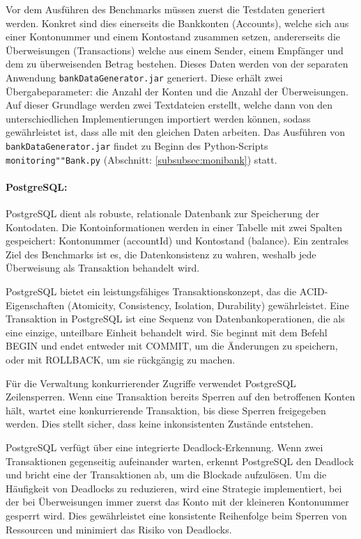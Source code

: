 \documentclass[fontsize=12pt,paper=a4,twoside=semi,parskip=half-,headsepline,headinclude]{scrreprt}
\begin{document}
 Vor dem Ausführen des Benchmarks müssen zuerst die Testdaten generiert werden. Konkret sind dies einerseits die Bankkonten (Accounts), welche sich aus einer Kontonummer und einem Kontostand zusammen setzen, andererseits die Überweisungen (Transactions) welche aus einem Sender, einem Empfänger und dem zu überweisenden Betrag bestehen. Dieses Daten werden von der separaten Anwendung \texttt{bankDataGenerator.jar} generiert. Diese erhält zwei Übergabeparameter: die Anzahl der Konten und die Anzahl der Überweisungen. Auf dieser Grundlage werden zwei Textdateien erstellt, welche dann von den unterschiedlichen Implementierungen importiert werden können, sodass gewährleistet ist, dass alle mit den gleichen Daten arbeiten. Das Ausführen von \texttt{bankDataGenerator.jar} findet zu Beginn des Python-Scripts \texttt{monitoring""Bank.py} (Abschnitt: \ref{subsubsec:monibank}) statt.
 
\paragraph{PostgreSQL:}

PostgreSQL dient als robuste, relationale Datenbank zur Speicherung der Kontodaten. Die Kontoinformationen werden in einer Tabelle mit zwei Spalten gespeichert: Kontonummer (accountId) und Kontostand (balance). Ein zentrales Ziel des Benchmarks ist es, die Datenkonsistenz zu wahren, weshalb jede Überweisung als Transaktion behandelt wird.

PostgreSQL bietet ein leistungsfähiges Transaktionskonzept, das die ACID-Eigenschaften (Atomicity, Consistency, Isolation, Durability) gewährleistet. Eine Transaktion in PostgreSQL ist eine Sequenz von Datenbankoperationen, die als eine einzige, unteilbare Einheit behandelt wird. Sie beginnt mit dem Befehl BEGIN und endet entweder mit COMMIT, um die Änderungen zu speichern, oder mit ROLLBACK, um sie rückgängig zu machen.

Für die Verwaltung konkurrierender Zugriffe verwendet PostgreSQL Zeilensperren. Wenn eine Transaktion bereits Sperren auf den betroffenen Konten hält, wartet eine konkurrierende Transaktion, bis diese Sperren freigegeben werden. Dies stellt sicher, dass keine inkonsistenten Zustände entstehen.

PostgreSQL verfügt über eine integrierte Deadlock-Erkennung. Wenn zwei Transaktionen gegenseitig aufeinander warten, erkennt PostgreSQL den Deadlock und bricht eine der Transaktionen ab, um die Blockade aufzulösen.
Um die Häufigkeit von Deadlocks zu reduzieren, wird eine Strategie implementiert, bei der bei Überweisungen immer zuerst das Konto mit der kleineren Kontonummer gesperrt wird. Dies gewährleistet eine konsistente Reihenfolge beim Sperren von Ressourcen und minimiert das Risiko von Deadlocks.
\end{document}

